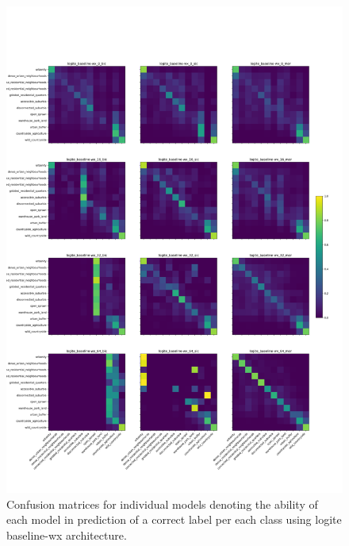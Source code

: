 \begin{figure}
    \centering
    \includegraphics[width=.9\linewidth]{fig/logite_baseline-wx_cm.png}
    \caption{\footnotesize Confusion matrices for individual models denoting
    the ability of each model in prediction of a correct label per each class
    using logite baseline-wx architecture.}
    \label{fig:maxprob_cm}
\end{figure}


